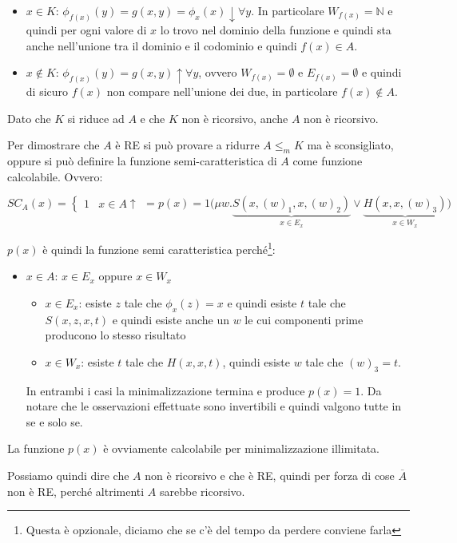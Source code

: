 \begin{itemize}
	\item $x \in K$: $\phi_{f(x)}(y) = g(x,y) = \phi_x(x) \downarrow \forall y$. In particolare $W_{f(x)} = \mathbb{N}$ e quindi per ogni valore di $x$ lo trovo nel dominio della funzione e quindi sta anche nell'unione tra il dominio e il codominio e quindi $f(x) \in A$.
	\item $x \notin K$: $\phi_{f(x)}(y) = g(x,y) \uparrow \forall y$, ovvero $W_{f(x)} = \emptyset$ e $E_{f(x)} = \emptyset$ e quindi di sicuro $f(x)$ non compare nell'unione dei due, in particolare $f(x) \notin A$.
\end{itemize}

Dato che $K$ si riduce ad $A$ e che $K$ non è ricorsivo, anche $A$ non è ricorsivo.

Per dimostrare che $A$ è RE si può provare a ridurre $A \leq_m K$ ma è sconsigliato, oppure si può definire la funzione semi-caratteristica di $A$ come funzione calcolabile.
Ovvero:

$$
SC_A(x) = \begin{cases}
1 &x \in A
\uparrow
\end{cases}  = p(x) =  1 \Big( \mu w . \underbrace{S(x, (w)_1, x, (w)_2)}_{x \in E_x} \vee \underbrace{H(x,x,(w)_3)}_{x \in W_x} \Big)
$$

$p(x)$ è quindi la funzione semi caratteristica  perché\footnote{Questa è opzionale, diciamo che se c'è del tempo da perdere conviene farla}:

\begin{itemize}
	\item $x \in A$:  $ x \in E_x $ oppure $ x \in W_x$
	\begin{itemize}
		\item $x \in E_x$: esiste $z$ tale che $\phi_x(z) = x$ e quindi esiste $t$ tale che $S(x,z,x,t)$ e quindi esiste anche un $w$ le cui componenti prime producono lo stesso risultato
		\item $x \in W_x$: esiste $t$ tale che $H(x,x,t)$, quindi esiste $w$ tale che $(w)_3 = t$.
	\end{itemize}
	In entrambi i casi la minimalizzazione termina e produce $p(x) = 1$. Da notare che le osservazioni effettuate sono invertibili e quindi valgono tutte in se e solo se.
\end{itemize}

La funzione $p(x)$ è ovviamente calcolabile per minimalizzazione illimitata.

Possiamo quindi dire che $A$ non è ricorsivo e che è RE, quindi per forza di cose $\overline{A}$ non è RE, perché altrimenti $A$ sarebbe ricorsivo.

